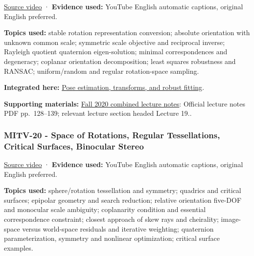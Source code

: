 \hypertarget{04-visual-computing-ii-ch036-mitv-19---absolute-orientation-in-closed-form-outliers-and-robustness-ransac}{}

\href{https://www.youtube.com/watch?v=kigLhcTm_gg}{Source video} · \textbf{Evidence used:} YouTube English automatic captions, original English preferred.

\textbf{Topics used:} stable rotation representation conversion; absolute orientation with unknown common scale; symmetric scale objective and reciprocal inverse; Rayleigh quotient quaternion eigen-solution; minimal correspondences and degeneracy; coplanar orientation decomposition; least squares robustness and RANSAC; uniform/random and regular rotation-space sampling.

\textbf{Integrated here:} \hyperref[04-visual-computing-ii-ch032-pose-estimation-transforms-and-robust-fitting]{Pose estimation, transforms, and robust fitting}.

\textbf{Supporting materials:} \href{https://ocw.mit.edu/courses/6-801-machine-vision-fall-2020/9ec44f69e72995c370b3797818ba01e6_MIT6_801F20_lectureNotes.pdf}{Fall 2020 combined lecture notes}: Official lecture notes PDF pp.~128--139; relevant lecture section headed Lecture 19..

\subsubsection{MITV-20 - Space of Rotations, Regular Tessellations, Critical Surfaces, Binocular Stereo}\label{04-visual-computing-ii-ch036-mitv-20---space-of-rotations-regular-tessellations-critical-surfaces-binocular-stereo}

\hypertarget{04-visual-computing-ii-ch036-mitv-20---space-of-rotations-regular-tessellations-critical-surfaces-binocular-stereo}{}

\href{https://www.youtube.com/watch?v=Mcy-LlcD8jI}{Source video} · \textbf{Evidence used:} YouTube English automatic captions, original English preferred.

\textbf{Topics used:} sphere/rotation tessellation and symmetry; quadrics and critical surfaces; epipolar geometry and search reduction; relative orientation five-DOF and monocular scale ambiguity; coplanarity condition and essential correspondence constraint; closest approach of skew rays and cheirality; image-space versus world-space residuals and iterative weighting; quaternion parameterization, symmetry and nonlinear optimization; critical surface examples.

